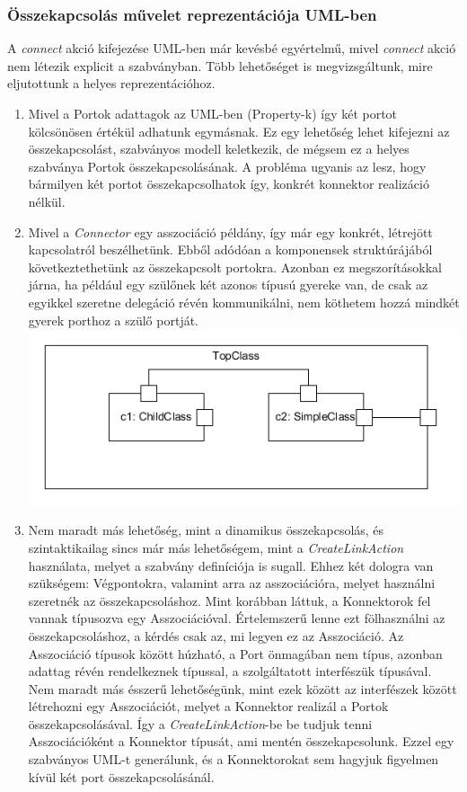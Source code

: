 \documentclass[a4paper,12pt]{report}
\begin{document}
\subsubsection{Összekapcsolás művelet reprezentációja UML-ben}
A \textit{connect} akció kifejezése UML-ben már kevésbé egyértelmű, mivel \textit{connect} akció nem létezik explicit a szabványban. Több lehetőséget is megvizsgáltunk, mire eljutottunk a helyes reprezentációhoz.
\begin{enumerate}
\item Mivel a Portok adattagok az UML-ben (Property-k) így két portot kölcsönösen értékül adhatunk egymásnak. Ez egy lehetőség lehet kifejezni az összekapcsolást, szabványos modell keletkezik, de mégsem ez a helyes szabványa Portok összekapcsolásának. A probléma ugyanis az lesz, hogy bármilyen két portot összekapcsolhatok így, konkrét konnektor realizáció nélkül.
\item Mivel a \textit{Connector} egy asszociáció példány, így már egy konkrét, létrejött kapcsolatról beszélhetünk. Ebből adódóan a komponensek struktúrájából következtethetünk az összekapcsolt portokra. Azonban ez megszorításokkal járna, ha például egy szülőnek két azonos típusú gyereke van, de csak az egyikkel szeretne delegáció révén kommunikálni, nem köthetem hozzá mindkét gyerek porthoz a szülő portját. \\
\includegraphics[scale=0.8]{preconnect_problem.png}
\item Nem maradt más lehetőség, mint a dinamikus összekapcsolás, és szintaktikailag sincs már más lehetőségem, mint a \textit{CreateLinkAction} használata, melyet a szabvány definíciója is sugall. Ehhez két dologra van szükségem: Végpontokra, valamint arra az asszociációra, melyet használni szeretnék az összekapcsoláshoz. Mint korábban láttuk, a Konnektorok fel vannak típusozva egy Asszociációval. Értelemszerű lenne ezt fölhasználni az összekapcsoláshoz, a kérdés csak az, mi legyen ez az Asszociáció. Az Asszociáció típusok között húzható, a Port önmagában nem típus, azonban adattag révén rendelkeznek típussal, a szolgáltatott interfészük típusával. Nem maradt más ésszerű lehetőségünk, mint ezek között az interfészek között létrehozni egy Asszociációt, melyet a Konnektor realizál a Portok összekapcsolásával. Így a \textit{CreateLinkAction}-be be tudjuk tenni Asszociációként a Konnektor típusát, ami mentén összekapcsolunk. Ezzel egy szabványos UML-t generálunk, és a Konnektorokat sem hagyjuk figyelmen kívül két port összekapcsolásánál. \\

\end{enumerate}
\end{document}
